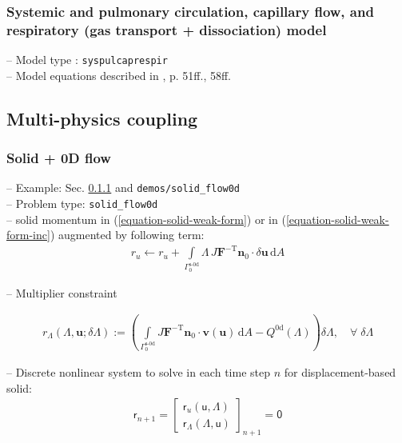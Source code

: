 \documentclass[a4paper,12pt]{report}
\newcommand{\fS}{\text{s}}
\newcommand{\bs}[1]{\boldsymbol{#1}}
\newcommand{\Gm}{\mathit{\Gamma}}
\newcommand{\ROP}{\bs{\mathsf{r}}}
\newcommand{\LMZ}{\bs{\mathsf{\Lambda}}}
\begin{document}
\subsubsection{Systemic and pulmonary circulation, capillary flow, and respiratory (gas transport + dissociation) model}

-- Model type : \verb"syspulcaprespir"\\

-- Model equations described in \cite{hirschvogel2019disspub}, p. 51ff., 58ff.


\subsection{Multi-physics coupling}\label{multi-physics-coupling}

\subsubsection{Solid + 0D flow}\label{solid-0d-flow}

-- Example: Sec. \ref{solid-0d-flow} and \verb"demos/solid_flow0d"\\

-- Problem type: \verb"solid_flow0d"\\

-- solid momentum in (\ref{equation-solid-weak-form}) or in (\ref{equation-solid-weak-form-inc}) augmented by following term:
\begin{equation}
\begin{aligned}
r_u \leftarrow r_u + \int\limits_{\Gm_0^{\fS\text{-}\mathrm{0d}}}\!\mathit{\Lambda}\,J\bs{F}^{-\mathrm{T}}\bs{n}_0\cdot\delta\bs{u}\,\mathrm{d}A
\end{aligned}
\end{equation}

-- Multiplier constraint

\begin{equation}
\begin{aligned}
r_{\mathit{\Lambda}}(\mathit{\Lambda},\bs{u};\delta\mathit{\Lambda}):= \left(\int\limits_{\Gm_0^{\mathrm{\fS\text{-}0d}}}\! J\bs{F}^{-\mathrm{T}}\bs{n}_{0}\cdot\bs{v}(\bs{u})\,\mathrm{d}A - Q^{\mathrm{0d}}(\mathit{\Lambda})\right) \delta\mathit{\Lambda}, \quad \forall \; \delta\mathit{\Lambda}
\end{aligned}
\end{equation}

-- Discrete nonlinear system to solve in each time step $n$ for displacement-based solid:
\begin{equation}
\label{equation-nonlin-sys-solid-0d}
\begin{aligned}
\ROP_{n+1} = \begin{bmatrix} \ROP_{u}(\bs{\mathsf{u}},\LMZ) \\ \ROP_{\mathit{\Lambda}}(\LMZ,\bs{\mathsf{u}}) \end{bmatrix}_{n+1} = \bs{\mathsf{0}}
\end{aligned}
\end{equation}
\end{document}
